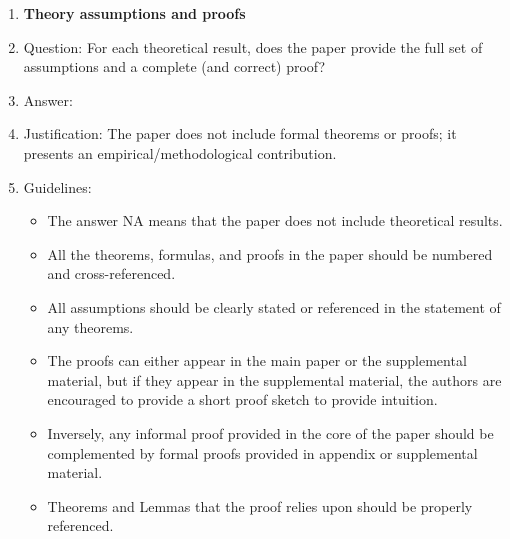 \documentclass{article}
\begin{document}
\begin{enumerate}
\item {\bf Theory assumptions and proofs}
    \item[] Question: For each theoretical result, does the paper provide the full set of assumptions and a complete (and correct) proof?
    \item[] Answer: \answerNA{}
    \item[] Justification: The paper does not include formal theorems or proofs; it presents an empirical/methodological contribution.
    \item[] Guidelines:
    \begin{itemize}
        \item The answer NA means that the paper does not include theoretical results. 
        \item All the theorems, formulas, and proofs in the paper should be numbered and cross-referenced.
        \item All assumptions should be clearly stated or referenced in the statement of any theorems.
        \item The proofs can either appear in the main paper or the supplemental material, but if they appear in the supplemental material, the authors are encouraged to provide a short proof sketch to provide intuition. 
        \item Inversely, any informal proof provided in the core of the paper should be complemented by formal proofs provided in appendix or supplemental material.
        \item Theorems and Lemmas that the proof relies upon should be properly referenced. 
    \end{itemize}


\end{enumerate}
\end{document}
